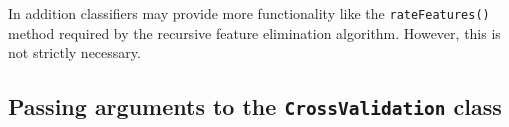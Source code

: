 \documentclass[a4paper,11pt]{scrartcl}
\newcommand{\code}[1]{\texttt{#1}}
\begin{document}
In addition classifiers may provide more functionality like the
\code{rateFeatures()} method required by the recursive feature elimination
algorithm. However, this is not strictly necessary.

\subsection{Passing arguments to the \code{CrossValidation} class}



\end{document}
